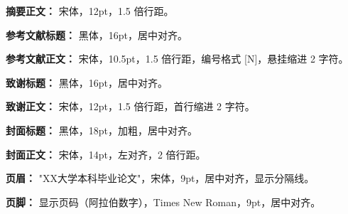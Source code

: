 \documentclass{softeng}
\begin{document}
\textbf{摘要正文：} 宋体，12pt，1.5 倍行距。

\textbf{参考文献标题：} 黑体，16pt，居中对齐。

\textbf{参考文献正文：} 宋体，10.5pt，1.5 倍行距，编号格式 [N]，悬挂缩进 2 字符。

\textbf{致谢标题：} 黑体，16pt，居中对齐。

\textbf{致谢正文：} 宋体，12pt，1.5 倍行距，首行缩进 2 字符。

\textbf{封面标题：} 黑体，18pt，加粗，居中对齐。

\textbf{封面正文：} 宋体，14pt，左对齐，2 倍行距。

\textbf{页眉：} "XX大学本科毕业论文"，宋体，9pt，居中对齐，显示分隔线。

\textbf{页脚：} 显示页码（阿拉伯数字），Times New Roman，9pt，居中对齐。
	
\end{document}
